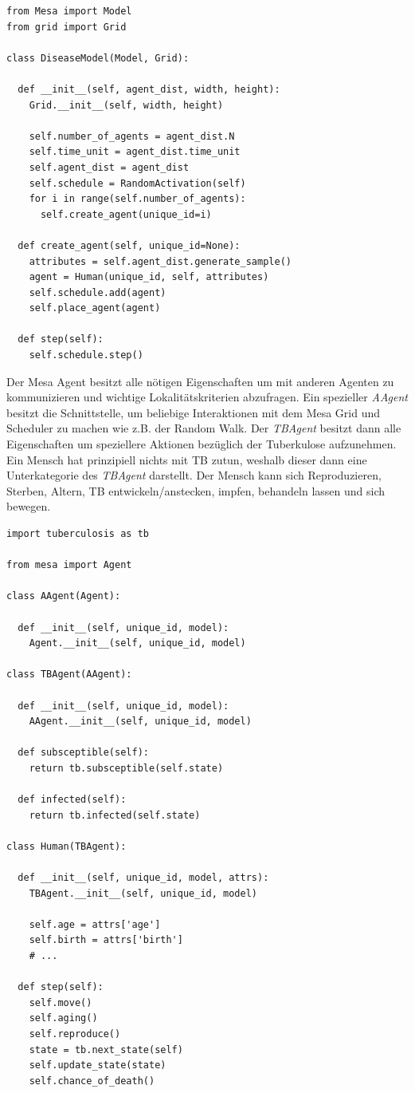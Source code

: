 \documentclass[paper=a4, fontsize=11pt, ngerman, abstract=on]{scrartcl}
\numberwithin{equation}{section} %
\numberwithin{figure}{section} %
\numberwithin{table}{section} %
\begin{document}
\begin{lstlisting}[style=python]
from Mesa import Model
from grid import Grid

class DiseaseModel(Model, Grid):

  def __init__(self, agent_dist, width, height):
    Grid.__init__(self, width, height)

    self.number_of_agents = agent_dist.N
    self.time_unit = agent_dist.time_unit
    self.agent_dist = agent_dist
    self.schedule = RandomActivation(self)
    for i in range(self.number_of_agents):
      self.create_agent(unique_id=i)

  def create_agent(self, unique_id=None):
    attributes = self.agent_dist.generate_sample()
    agent = Human(unique_id, self, attributes)
    self.schedule.add(agent)
    self.place_agent(agent)

  def step(self):
    self.schedule.step()
\end{lstlisting}

Der Mesa Agent besitzt alle nötigen Eigenschaften um mit anderen Agenten zu kommunizieren und wichtige Lokalitätskriterien abzufragen. Ein spezieller \textit{AAgent} besitzt die Schnittstelle, um beliebige Interaktionen mit dem Mesa Grid und Scheduler zu machen wie z.B. der Random Walk. Der \textit{TBAgent} besitzt dann alle Eigenschaften um speziellere Aktionen bezüglich der Tuberkulose aufzunehmen. Ein Mensch hat prinzipiell nichts mit TB zutun, weshalb dieser dann eine Unterkategorie des \textit{TBAgent} darstellt. Der Mensch kann sich Reproduzieren, Sterben, Altern, TB entwickeln/anstecken, impfen, behandeln lassen und sich bewegen.

\begin{lstlisting}[style=python]
import tuberculosis as tb

from mesa import Agent

class AAgent(Agent):

  def __init__(self, unique_id, model):
    Agent.__init__(self, unique_id, model)

class TBAgent(AAgent):

  def __init__(self, unique_id, model):
    AAgent.__init__(self, unique_id, model)

  def subsceptible(self):
    return tb.subsceptible(self.state)

  def infected(self):
    return tb.infected(self.state)

class Human(TBAgent):

  def __init__(self, unique_id, model, attrs):
    TBAgent.__init__(self, unique_id, model)

    self.age = attrs['age']
    self.birth = attrs['birth']
    # ...

  def step(self):
    self.move()
    self.aging()
    self.reproduce()
    state = tb.next_state(self)
    self.update_state(state)
    self.chance_of_death()
\end{lstlisting}
\end{document}
